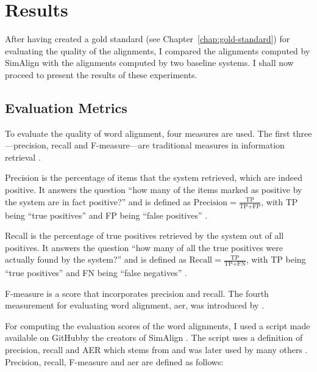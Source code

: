\chapter{Results}\label{chap:results}

After having created a gold standard (see Chapter~\ref{chap:gold-standard}) for evaluating the quality of the alignments, I compared the alignments computed by SimAlign with the alignments computed by two baseline systems.
I shall now proceed to present the results of these experiments.

\section{Evaluation Metrics}
\label{sec:evaluation-metrics}
To evaluate the quality of word alignment, four measures are used. 
The first three---precision, recall and F-measure---are traditional measures in information retrieval \autocite{mihalcea-pedersen-2003-evaluation}.

Precision is the percentage of items that the system retrieved, which are indeed positive.
It answers the question \enquote{how many of the items marked as positive by the system are in fact positive?} and is defined as $\text{Precision}=\frac{\text{TP}}{\text{TP}+\text{FP}}$, with TP being \enquote{true positives} and FP being \enquote{false positives} \autocite[67]{jurafsky-2019}.

Recall is the percentage of true positives retrieved by the system out of all positives.
It answers the question \enquote{how many of all the true positives were actually found by the system?} and is defined as $\text{Recall}=\frac{\text{TP}}{\text{TP}+\text{FN}}$, with TP being \enquote{true positives} and FN being \enquote{false negatives} \autocite[67]{jurafsky-2019}.

F-measure is a score that incorporates precision and recall. 
The fourth measurement for evaluating word alignment, \acrfull{aer}, was introduced by \cite{och-ney-2000-improved}. 

For computing the evaluation scores of the word alignments, I used a script made available on GitHub\footnotemark by the creators of SimAlign \autocite{jalili-sabet-etal-2020-simalign}. 
The script uses a definition of precision, recall and AER which stems from \cite{och-ney-2000-improved} and was later used by many others \autocites{mihalcea-pedersen-2003-evaluation,och-ney-2003-systematic,Ostling2016efmaral,jalili-sabet-etal-2020-simalign}. Precision, recall, F-measure and \acrshort{aer} are defined as follows:

